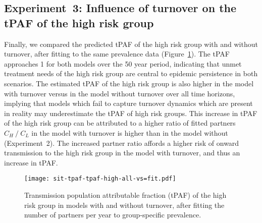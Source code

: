 \subsection{Experiment~3: Influence of turnover on the tPAF of the high risk group}
\label{ss:res-tpaf}
Finally, we compared the predicted tPAF of the high risk group
with and without turnover, after fitting to the same prevalence data
(Figure~\ref{fig:tpaf-fit}).
The tPAF approaches 1 for both models over the 50 year period,
indicating that unmet treatment needs of the high risk group
are central to epidemic persistence in both scenarios.
The estimated tPAF of the high risk group is also higher
in the model with turnover versus
in the model without turnover
over all time horizons,
implying that models which fail to capture turnover dynamics which are present in reality
may underestimate the tPAF of high risk groups.
This increase in tPAF of the high risk group can be attributed to
a higher ratio of fitted partners $C_H~/~C_L$
in the model with turnover is higher than in the model without
(Experiment~2).
The increased partner ratio affords
a higher risk of onward transmission to the high risk group
in the model with turnover, and thus an increase in tPAF.
\begin{figure}[!tbp]
  \centering
  \texttt{[image: sit-tpaf-tpaf-high-all-vs=fit.pdf]}
  \caption{Transmission population attributable fraction (tPAF)
    of the high risk group in models with and without turnover,
    after fitting the number of partners per year to group-specific prevalence.}
  \label{fig:tpaf-fit}
\end{figure}
